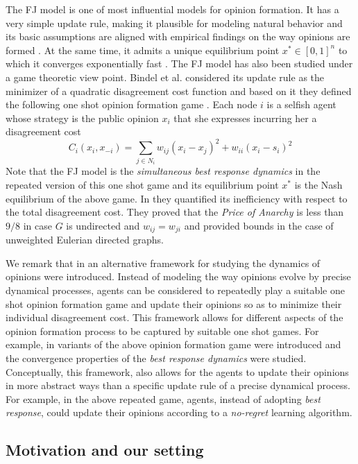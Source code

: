 The FJ model is one of most influential models for opinion formation. It has a
very simple update rule, making it plausible for modeling natural behavior and
its basic assumptions are aligned with empirical findings on the way opinions
are formed \cite{AFH05,K47}.  At the same time, it admits a unique equilibrium
point $x^* \in [0,1]^n$ to which it converges exponentially fast \cite{GS14}.
The FJ model has also been studied under a game theoretic view point.  Bindel
et al. considered its update rule as the minimizer of a quadratic disagreement
cost function and based on it they defined the following one shot opinion
formation game \cite{BKO11}. Each node $i$ is a selfish agent whose strategy is
the public opinion $x_i$ that she expresses incurring her a disagreement cost
%
\begin{equation}\label{eq:BKO_cost}
  C_i(x_i,x_{-i})= \sum_{j \in N_i}w_{ij} (x_i-x_j)^2 + w_{ii}(x_i-s_i)^2
\end{equation}
%
Note that the FJ model is the \emph{simultaneous best response dynamics} in the
repeated version of this one shot game and its equilibrium point $x^*$ is the
Nash equilibrium of the above game.  In \cite{BKO11} they quantified its
inefficiency with respect to the total disagreement cost. They proved that the
\emph{Price of Anarchy} is less than $9/8$ in case $G$ is undirected and
$w_{ij}=w_{ji}$ and provided bounds in the case of unweighted Eulerian directed
graphs.

We remark that in \cite{BKO11} an alternative framework for studying the
dynamics of opinions were introduced. Instead of modeling the way opinions
evolve by precise dynamical processes, agents can be considered to repeatedly
play a suitable one shot opinion formation game and update their opinions so as
to minimize their individual disagreement cost.  This framework allows for
different aspects of the opinion formation process to be captured by suitable
one shot games.  For example, in \cite{BGM13,BFM16,EFHS17} variants of the
above opinion formation game were introduced and the convergence properties of
the \emph{best response dynamics} were studied.  Conceptually, this framework,
also allows for the agents to update their opinions in more abstract ways than
a specific update rule of a precise dynamical process.  For example, in the
above repeated game, agents, instead of adopting \emph{best response}, could
update their opinions according to a \emph{no-regret} learning algorithm.

\subsection{Motivation and our setting}

